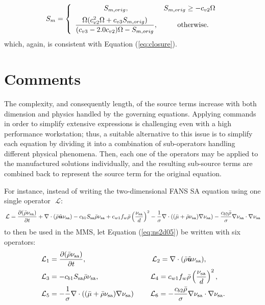 \documentclass[10pt]{article}
\newcommand{\Diff}[2] {\dfrac{\partial( #1)}{\partial #2}}
\newcommand{\bv}[1]{\ensuremath{\mbox{\boldmath$ #1 $}}}
\newcommand{\Lo}{\,\mathcal{L}}
\newcommand{\sa}{\nu_{\mathrm{sa}}}
\newcommand{\tsa}{\mathrm{sa}}
\newcommand{\brho}{\bar{\rho}}
\newcommand{\bmu}{\bar{\mu}}
\begin{document}
\begin{equation*}
S_m = \left\{ \begin{array}{cc}
S_{m, orig}, & S_{m,orig} \geq -c_{v2} \Omega \vspace{5pt}\\ 
\dfrac{\Omega (c_{v2}^2 \Omega + c_{v3} S_{m,orig})}{ (c_{v3}-2.0c_{v2}) \Omega - S_{m,orig}}, & \quad \mathrm{otherwise}.
\end{array}
\right.
\end{equation*}
which, again, is consistent with Equation (\ref{eq:closure}). 

\section{Comments}
The complexity, and consequently length, of the source terms increase with both dimension and physics handled by the governing equations. 
Applying commands in order to simplify extensive expressions is challenging even with a high performance workstation; thus, a suitable alternative to this issue is to simplify each equation by dividing it into a combination of sub-operators handling different physical phenomena. Then, each one of the operators may be applied to the manufactured solutions individually, and the resulting sub-source terms are combined back to represent the source term for the original equation.


For instance, instead of writing the two-dimensional FANS SA equation using one single operator~$\Lo$:
 \begin{equation} \label{eq:ns2d05}
\Lo=\Diff{\bar{\rho} \sa}{t} +\nabla \cdot (\bar{\rho} \tilde{\bv{u}} \sa) - c_{b1} S_\tsa \bar{\rho} \sa +c_{w1} f_w \brho \left(\dfrac{\sa}{d}\right)^2 - \dfrac{1}{\sigma}\nabla \cdot \left( (\bmu+\bar{\rho}  \sa) \nabla \sa\right) -\dfrac{c_{b2} \bar{\rho} }{\sigma} \nabla \sa \cdot \nabla \sa
\end{equation}
to then be used in the MMS, let Equation (\ref{eq:ns2d05}) be written with six operators:
\begin{equation}
 \begin{split}\label{sub01}
  \Lo_1&=\Diff{\bar{\rho} \sa}{t},\qquad\qquad\qquad\qquad\quad  \Lo_2=\nabla \cdot (\bar{\rho} \tilde{\bv{u}} \sa) ,\\
  \Lo_3&=- c_{b1} S_\tsa \bar{\rho} \sa ,\quad\quad\quad \qquad\qquad\Lo_4=c_{w1} f_w \brho \left(\dfrac{\sa}{d}\right)^2 ,\\
  \Lo_5&=- \dfrac{1}{\sigma}\nabla \cdot \left( (\bmu+\bar{\rho}  \sa) \nabla \sa\right) \quad\quad  \Lo_6= -\dfrac{c_{b2} \bar{\rho} }{\sigma} \nabla \sa \cdot \nabla \sa.
 \end{split}
\end{equation}
\end{document}
